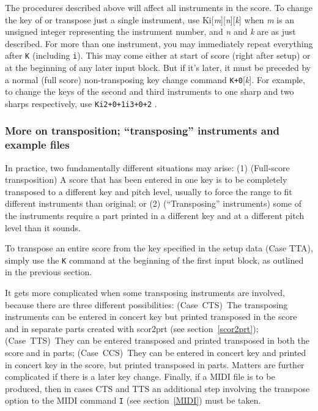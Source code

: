 \documentclass[11pt]{article}
\begin{document}
The procedures described above will affect all instruments in the score. To change the key of or
transpose just a single instrument, use Ki[{\it m}][{\it n}][{\it k}] when {\it m} is an unsigned integer 
representing the instrument number, and {\it n} and {\it k} are as just described. 
For more than one instrument, you may immediately repeat everything after {\tt K} (including {\tt i}). 
This may come either at start of score (right after setup) or at the beginning of any later input
block. But if it's later, it must be preceded by a normal 
(full score) non-transposing key change command {\tt K+0}[{\it k}]. 
For example, to change the keys of the second and third instruments to one sharp and two sharps
respectively, use {\tt Ki2+0+1i3+0+2} .

\subsubsection{More on transposition; ``transposing'' instruments and example files}

In practice, two fundamentally different situations may arise: (1) (Full-score transposition) A 
score that has been entered in one key
is to be completely transposed to a different key and pitch level, usually to force the range to fit
different instruments than original; or (2) (``Transposing''
instruments) some of the instruments require a part printed in a different key and at a different
pitch level than it sounds.

To transpose
an entire score from the key specified in the setup data (Case TTA), simply use the 
{\tt K} command at the
beginning of the first input block, as outlined in the previous section. 

It gets more complicated when some transposing instruments are involved, 
because there are three different possibilities:
(Case~CTS)~The transposing instruments can be entered in concert key but printed
transposed in the score and in separate parts created with {\bfx scor2prt} (see 
section~\ref{scor2prt});
(Case~TTS)~They can be entered transposed and printed transposed in
both the score and in parts;
(Case~CCS)~They can be entered in concert key and printed in concert key in the score, but
printed transposed in parts. Matters are further complicated if there is a later key 
change. Finally, if a MIDI file is to be produced, then in cases CTS and TTS an additional 
step involving the transpose option to the MIDI command {\tt I} 
(see section~\ref{MIDI}) must be taken. 
\end{document}
